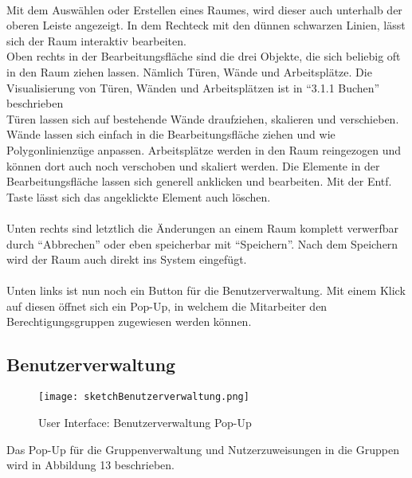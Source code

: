 \paragraph{}Mit dem Auswählen oder Erstellen eines Raumes, wird dieser auch unterhalb der oberen Leiste angezeigt. 
In dem Rechteck mit den dünnen schwarzen Linien, lässt sich der Raum interaktiv bearbeiten.
\\
Oben rechts in der Bearbeitungsfläche sind die drei Objekte, die sich beliebig oft in den Raum ziehen lassen.
Nämlich Türen, Wände und Arbeitsplätze.
Die Visualisierung von Türen, Wänden und Arbeitsplätzen ist in "`3.1.1 Buchen"' beschrieben
\\
Türen lassen sich auf bestehende Wände draufziehen, skalieren und verschieben.
Wände lassen sich einfach in die Bearbeitungsfläche ziehen und wie Polygonlinienzüge anpassen.
Arbeitsplätze werden in den Raum reingezogen und können dort auch noch verschoben und skaliert werden.
Die Elemente in der Bearbeitungsfläche lassen sich generell anklicken und bearbeiten.
Mit der Entf. Taste lässt sich das angeklickte Element auch löschen.

\paragraph{} Unten rechts sind letztlich die Änderungen an einem Raum komplett verwerfbar durch "`Abbrechen"'
oder eben speicherbar mit "`Speichern"'.
Nach dem Speichern wird der Raum auch direkt ins System eingefügt.

\paragraph{} Unten links ist nun noch ein Button für die Benutzerverwaltung.
Mit einem Klick auf diesen öffnet sich ein Pop-Up, in welchem die Mitarbeiter den Berechtigungsgruppen zugewiesen werden können.

\newpage
\subsection{Benutzerverwaltung}

\begin{wrapfigure}[20]{r}{5.5cm}
  \texttt{[image: sketchBenutzerverwaltung.png]}
  \caption{User Interface: Benutzerverwaltung Pop-Up}
\end{wrapfigure}

Das Pop-Up für die Gruppenverwaltung und Nutzerzuweisungen in die Gruppen wird in Abbildung 13 beschrieben.
\\
